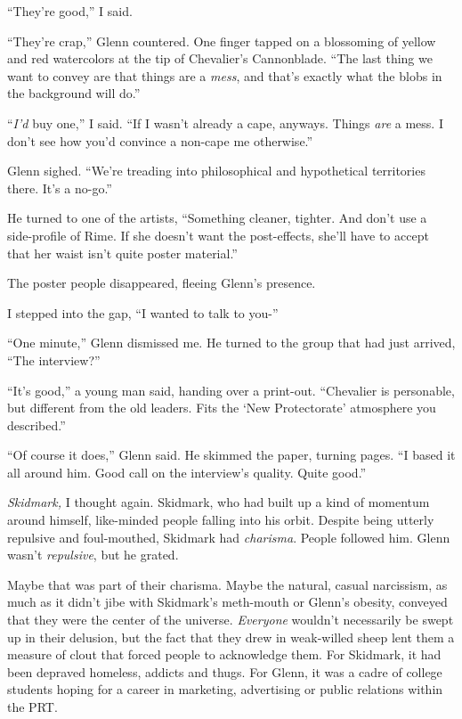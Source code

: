 ``They're good,'' I said.



``They're crap,'' Glenn countered.  One finger tapped on a blossoming of yellow and red watercolors at the tip of Chevalier's Cannonblade.  ``The last thing we want to convey are that things are a \emph{mess}, and that's exactly what the blobs in the background will do.''



``\emph{I'd} buy one,'' I said.  ``If I wasn't already a cape, anyways.  Things \emph{are} a mess.  I don't see how you'd convince a non-cape me otherwise.''



Glenn sighed.  ``We're treading into philosophical and hypothetical territories there.  It's a no-go.''



He turned to one of the artists,  ``Something cleaner, tighter.  And don't use a side-profile of Rime.  If she doesn't want the post-effects, she'll have to accept that her waist isn't quite poster material.''



The poster people disappeared, fleeing Glenn's presence.



I stepped into the gap, ``I wanted to talk to you-''



``One minute,'' Glenn dismissed me.  He turned to the group that had just arrived, ``The interview?''



``It's good,'' a young man said, handing over a print-out.  ``Chevalier is personable, but different from the old leaders.  Fits the `New Protectorate' atmosphere you described.''



``Of course it does,'' Glenn said.  He skimmed the paper, turning pages.  ``I based it all around him.  Good call on the interview's quality.  Quite good.''



\emph{Skidmark, } I thought again.  Skidmark, who had built up a kind of momentum around himself, like-minded people falling into his orbit.  Despite being utterly repulsive and foul-mouthed, Skidmark had \emph{charisma}.  People followed him.  Glenn wasn't \emph{repulsive}, but he grated.



Maybe that was part of their charisma.  Maybe the natural, casual narcissism, as much as it didn't jibe with Skidmark's meth-mouth or Glenn's obesity, conveyed that they were the center of the universe.  \emph{Everyone} wouldn't necessarily be swept up in their delusion, but the fact that they drew in weak-willed sheep lent them a measure of clout that forced people to acknowledge them.  For Skidmark, it had been depraved homeless, addicts and thugs.  For Glenn, it was a cadre of college students hoping for a career in marketing, advertising or public relations within the PRT.



